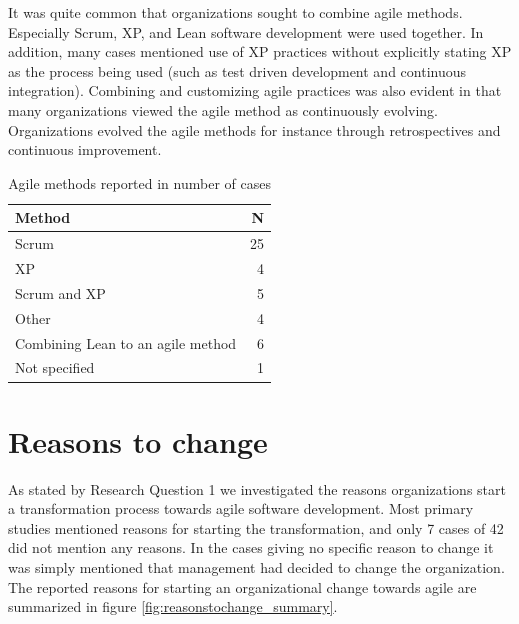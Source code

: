 It was quite common that organizations sought to combine agile methods.
Especially Scrum, XP, and Lean software development were used together. In
addition, many cases mentioned use of XP practices without explicitly stating XP
as the process being used (such as test driven development and continuous
integration). Combining and customizing agile practices was also evident in that
many organizations viewed the agile method as continuously evolving.
Organizations evolved the agile methods for instance through retrospectives and
continuous improvement.

\begin{table}[h]
    \centering
    \begin{tabular}{ l r }
        \toprule
        Method                             &  N  \\
        \midrule
        Scrum                              &  25 \\
        XP                                 &  4  \\
        Scrum and XP                       &  5  \\
        Other                              &  4  \\
        Combining Lean to an agile method  &  6  \\
        Not specified                      &  1  \\
        \bottomrule
    \end{tabular}
    \caption{Agile methods reported in number of cases}
    \label{table:agilemethods}
\end{table}


\clearpage

\section{Reasons to change}

As stated by Research Question 1 we investigated the reasons organizations start
a transformation process towards agile software development. Most primary
studies mentioned reasons for starting the transformation, and only 7 cases of
42 did not mention any reasons. In the cases giving no specific reason to change
it was simply mentioned that management had decided to change the organization.
The reported reasons for starting an organizational change towards agile are
summarized in figure \ref{fig:reasonstochange_summary}.



